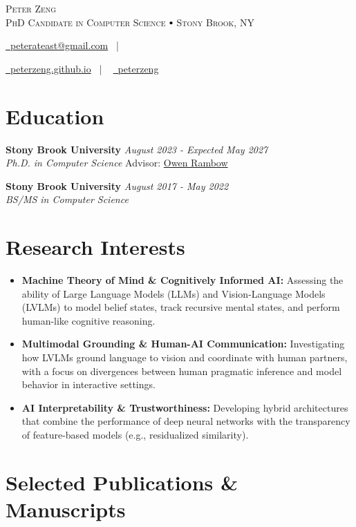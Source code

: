 \documentclass[letterpaper,10pt]{article}
\newcommand\sbullet[1][.5]{\mathbin{\vcenter{\hbox{\scalebox{#1}{$\bullet$}}}}}
\newcommand{\organization}[4]{
    \vspace{-1.0pt}
    \textbf{#1} \hfill{\emph{#2}} \\
    \emph{#3} \hfill{#4} \\
    \vspace{1.5pt} %
}
\newcommand{\myEmail}[1]{
    \href{mailto:#1}{\faEnvelope \ #1}
    \ |
}
\newcommand{\myGitHub}[1]{
    \href{https://github.com/#1/}{\faGithub \ #1}
    \ 
}
\newcommand{\myName}[5]{
    \begin{center}
        {\huge{\color{burgundy}\scshape{#1}}} \\
        \vspace{5pt}
        {\large \scshape #5} \\ %
        \vspace{5pt}
        \myEmail{#4}
        \href{https://peterzeng.github.io/}{\faLink \ peterzeng.github.io} \ | \ 
        \myGitHub{#3}
    \end{center}
    \vspace{-4pt}
}
\begin{document}
    \myName{Peter Zeng}{}{peterzeng}{peterateast@gmail.com}
    {PhD Candidate in Computer Science $\sbullet[.75]$ Stony Brook, NY} 

    \section{Education}
    \organization{Stony Brook University}{August 2023 - Expected May 2027}
        {Ph.D. in Computer Science}{Advisor: \href{https://owenrambow.com/}{Owen Rambow}} 

    \organization{Stony Brook University}{August 2017 - May 2022}
        {BS/MS in Computer Science}{}

    \section{Research Interests}
    \vspace{-2pt}
    \begin{itemize}[leftmargin=0.6cm]
        \item \textbf{Machine Theory of Mind \& Cognitively Informed AI:} Assessing the ability of Large Language Models (LLMs) and Vision-Language Models (LVLMs) to model belief states, track recursive mental states, and perform human-like cognitive reasoning.
        \item \textbf{Multimodal Grounding \& Human-AI Communication:} Investigating how LVLMs ground language to vision and coordinate with human partners, with a focus on divergences between human pragmatic inference and model behavior in interactive settings.
        \item \textbf{AI Interpretability \& Trustworthiness:} Developing hybrid architectures that combine the performance of deep neural networks with the transparency of feature-based models (e.g., residualized similarity).
    \end{itemize}

    \section{Selected Publications \& Manuscripts}
\end{document}
